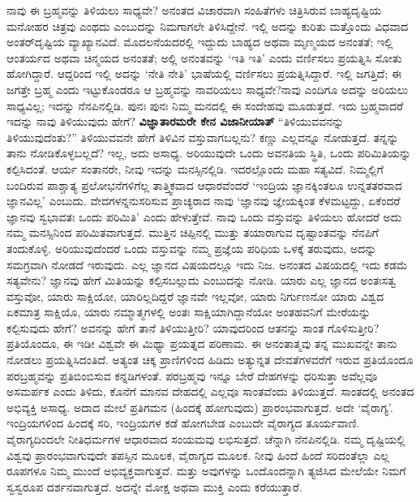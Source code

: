 ನಾವು ಈ ಬ್ರಹ್ಮವನ್ನು ತಿಳಿಯಲು ಸಾಧ್ಯವೇ? ಅನಂತದ ವಿಚಾರವಾಗಿ ಸಂಹಿತೆಗಳು ಚಿತ್ರಿಸಿರುವ ಬಾಹ್ಯದೃಷ್ಟಿಯ ಮನೋಹರ ಚಿತ್ರವು ಎಂಥದು ಎಂಬುದನ್ನು ನಿಮಗಾಗಲೇ ತಿಳಿಸಿದ್ದೇನೆ. ಇಲ್ಲಿ ಅದನ್ನು ಕುರಿತು ಮತ್ತೊಂದು ವಿಧವಾದ ಅಂತರ್​ದೃಷ್ಟಿಯ ವ್ಯಾಖ್ಯಾನವಿದೆ. ಮೊದಲನೆಯದರಲ್ಲಿ ಇದ್ದುದು ಬಾಹ್ಯದ ಅಥವಾ ಮೃಣ್ಮಯದ ಅನಂತತೆ; ಇಲ್ಲಿ ಆಂತರ್ಯದ ಅಥವಾ ಚಿನ್ಮಯದ ಅನಂತತೆ; ಅಲ್ಲಿ ಅನಂತವನ್ನು ‘ಇತಿ ಇತಿ’ ಎಂದು ವರ್ಣಿಸಲು ಪ್ರಯತ್ನಿಸಿ ಸೋತು ಹೋಗಿದ್ದಾರೆ. ಆದ್ದರಿಂದ ಇಲ್ಲಿ ಅದನ್ನು ‘ನೇತಿ ನೇತಿ’ ಭಾಷೆಯಲ್ಲಿ ವರ್ಣಿಸಲು ಪ್ರಯತ್ನಿಸಿದ್ದಾರೆ. ಇಲ್ಲಿ ಜಗತ್ತಿದೆ; ಈ ಜಗತ್ತೇ ಬ್ರಹ್ಮ ಎಂದು ಇಟ್ಟುಕೊಂಡರೂ ಆ ಬ್ರಹ್ಮವನ್ನು ನಾವರಿಯಲು ಸಾಧ್ಯವೇ?ನಾವು ಎಂದಿಗೂ ಅದನ್ನು ಅರಿಯಲು ಸಾಧ್ಯವಿಲ್ಲ; ಇದನ್ನು ನೆನಪಿನಲ್ಲಿಡಿ. ಪುನಃ ಪುನಃ ನಿಮ್ಮ ಮನದಲ್ಲಿ ಈ ಸಂದೇಹವು ಮೂಡುತ್ತದೆ. ಇದು ಬ್ರಹ್ಮವಾದರೆ ಇದನ್ನು ನಾವು ತಿಳಿಯುವುದು ಹೇಗೆ? \textbf{ವಿಜ್ಞಾತಾರಮರೇ ಕೇನ ವಿಜಾನೀಯಾತ್​} “ತಿಳಿಯುವವನನ್ನು ತಿಳಿಯುವುದೆಂತು?” ತಿಳಿಯುವವನೇ ಹೇಗೆ ತಿಳಿವಿನ ವಸ್ತುವಾಗಬಲ್ಲನು? ಕಣ್ಣು ಎಲ್ಲವನ್ನೂ ನೋಡುತ್ತದೆ. ತನ್ನನ್ನು ತಾನು ನೋಡಿಕೊಳ್ಳಬಲ್ಲದೆ? ಇಲ್ಲ, ಅದು ಅಸಾಧ್ಯ. ಅರಿಯುವುದೇ ಒಂದು ಅವನತಿಯ ಸ್ಥಿತಿ, ಒಂದು ಪರಿಮಿತಿಯನ್ನು ಕಲ್ಪಿಸಿದಂತೆ. ಆರ್ಯ ಸಂತಾನರೇ, ನೀವು ಇದನ್ನು ಮನಸ್ಸಿನಲ್ಲಿಡಿ. ಇದರಲ್ಲೊಂದು ಮಹಾ ಸತ್ಯವಿದೆ. ನಿಮ್ಮಲ್ಲಿಗೆ ಬಂದಿರುವ ಪಾಶ್ಚಾತ್ಯ ಪ್ರಲೋಭನೆಗಳಿಗೆಲ್ಲ ತಾತ್ತ್ವಿಕವಾದ ಆಧಾರವೆಂದರೆ ‘ಇಂದ್ರಿಯ ಜ್ಞಾನಕ್ಕಿಂತಲೂ ಉನ್ನತತರವಾದ ಜ್ಞಾನವಿಲ್ಲ’ ಎಂಬುದು. ವೇದಗಳನ್ನನುಸರಿಸುವ ಪ್ರಾಚ್ಯರಾದ ನಾವು ‘ಜ್ಞಾನವು ಜ್ಞೇಯಕ್ಕಿಂತ ಕೆಳಮಟ್ಟದ್ದು, ಏಕೆಂದರೆ ಜ್ಞಾನವು ಸ್ವಭಾವತಃ ಒಂದು ಪರಿಮಿತಿ’ ಎಂದು ಹೇಳುತ್ತೇವೆ. ನಾವು ಒಂದು ವಸ್ತುವನ್ನು ತಿಳಿಯಲು ಹೋದರೆ ಅದು ನಮ್ಮ ಮನಸ್ಸಿನಿಂದ ಪರಿಮಿತವಾಗುತ್ತದೆ. ಮುತ್ತಿನ ಚಿಪ್ಪಿನಲ್ಲಿ ಮುತ್ತು ತಯಾರಾಗುವ ದೃಷ್ಟಾಂತವನ್ನು ನೆನಪಿಗೆ ತಂದುಕೊಳ್ಳಿ. ಅರಿಯುವುದೆಂದರೆ ಒಂದು ವಸ್ತುವನ್ನು ನಮ್ಮ ಪ್ರಜ್ಞೆಯ ಪರಿಧಿಯ ಒಳಕ್ಕೆ ತರುವುದು, ಅದನ್ನು ಸಮಗ್ರವಾಗಿ ನೋಡದೆ ಇರುವುದು. ಎಲ್ಲ ಜ್ಞಾನದ ವಿಷಯದಲ್ಲೂ ಇದು ನಿಜ. ಅನಂತದ ವಿಷಯದಲ್ಲಿ ಇದು ಕಡಮೆ ಸತ್ಯವೇನು? ಜ್ಞಾನವು ಹೇಗೆ ಮಿತಿಯನ್ನು ಕಲ್ಪಿಸಬಲ್ಲುದು ಎಂಬುದನ್ನು ನೋಡಿ. ಯಾರು ಎಲ್ಲ ಜ್ಞಾನದ ಅಂತಃಸತ್ವ ವಸ್ತುವೋ, ಯಾರು ಸಾಕ್ಷಿಯೋ, ಯಾರಿಲ್ಲದಿದ್ದರೆ ಜ್ಞಾನವೇ ಇಲ್ಲವೋ, ಯಾರು ನಿರ್ಗುಣನೋ ಯಾರು ವಿಶ್ವದ ಏಕಮಾತ್ರ ಸಾಕ್ಷಿಯೊ, ಯಾರು ನಮ್ಮಾತ್ಮಗಳಲ್ಲಿ ಅಂತಃ ಸಾಕ್ಷಿಯಾಗಿದ್ದಾನೆಯೋ ಅಂತಹವನಿಗೆ ಮೇರೆಯನ್ನು ಕಲ್ಪಿಸುವುದು ಹೇಗೆ? ಅವನನ್ನು ಹೇಗೆ ತಾನೆ ತಿಳಿಯುತ್ತೀರಿ? ಯಾವುದರಿಂದ ಆತನನ್ನು ಸಾಂತ ಗೊಳಿಸುತ್ತೀರಿ? ಪ್ರತಿಯೊಂದೂ, ಈ ಇಡೀ ವಿಶ್ವವೇ ಈ ಮಿಥ್ಯಾ ಪ್ರಯತ್ನದ ಪರಿಣಾಮ. ಈ ಅನಂತಾತ್ಮವು ತನ್ನ ಮುಖವನ್ನೇ ತಾನು ನೋಡಲು ಪ್ರಯತ್ನಿಸಿದಂತಿದೆ. ಅತ್ಯಂತ ಚಿಕ್ಕ ಪ್ರಾಣಿಗಳಿಂದ ಹಿಡಿದು ಅತ್ಯುನ್ನತ ದೇವತೆಗಳವರೆಗೆ ಇರುವ ಪ್ರತಿಯೊಂದೂ ಪರಬ್ರಹ್ಮವನ್ನು ಪ್ರತಿಬಿಂಬಿಸುವ ಕನ್ನಡಿಗಳಂತೆ. ಪರಬ್ರಹ್ಮವು ಇನ್ನೂ ಬೇರೆ ದೇಹಗಳನ್ನು ಧರಿಸುತ್ತಾ ಅವೆಲ್ಲವೂ ಅಸಮರ್ಪಕ ಎಂದು ತಿಳಿದು, ಕೊನೆಗೆ ಮಾನವ ದೇಹದಲ್ಲಿ ಎಲ್ಲವೂ ಸಾಂತವೆಂದು ತಿಳಿಯುತ್ತದೆ. ಸಾಂತದಲ್ಲಿ ಅನಂತದ ಅಭಿವ್ಯಕ್ತಿ ಅಸಾಧ್ಯ. ಅದಾದ ಮೇಲೆ ಪ್ರತಿಗಮನ (ಹಿಂದಕ್ಕೆ ಹೋಗುವುದು) ಪ್ರಾರಂಭವಾಗುತ್ತದೆ. ಅದೇ ‘ವೈರಾಗ್ಯ’. ಇಂದ್ರಿಯಗಳಿಂದ ಹಿಂದಕ್ಕೆ ಸರಿ, ಇಂದ್ರಿಯಗಳ ಕಡೆ ಹೋಗಬೇಡ ಎಂಬುದೇ ವೈರಾಗ್ಯದ ತೂರ್ಯವಾಣಿ. ವೈರಾಗ್ಯದಿಂದಲೇ ನೀತಿಧರ್ಮಗಳ ಆಧಾರವಾದ ಸಂಯಮವು ಲಭಿಸುತ್ತದೆ. ಚೆನ್ನಾಗಿ ನೆನಪಿನಲ್ಲಿಡಿ. ನಮ್ಮ ದೃಷ್ಟಿಯಲ್ಲಿ ವಿಶ್ವವು ಪ್ರಾರಂಭವಾಗುವುದೇ ತಪಸ್ಸಿನ ಮೂಲಕ, ವೈರಾಗ್ಯದ ಮೂಲಕ. ನೀವು ಹಿಂದೆ ಹಿಂದೆ ಸರಿದಂತೆಲ್ಲಾ ಎಲ್ಲ ರೂಪಗಳೂ ನಿಮ್ಮ ಮುಂದೆ ಅಭಿವ್ಯಕ್ತವಾಗುತ್ತವೆ. ಮತ್ತು ಅವುಗಳನ್ನು ಒಂದೊಂದನ್ನಾಗಿ ತ್ಯಜಿಸಿದ ಮೇಲೆಯೇ ನಿಮಗೆ ಸ್ವಸ್ವರೂಪ ದರ್ಶನವಾಗುತ್ತದೆ. ಅದನ್ನೇ ಮೋಕ್ಷ ಅಥವಾ ಮುಕ್ತಿ ಎಂದು ಕರೆಯುತ್ತಾರೆ.

